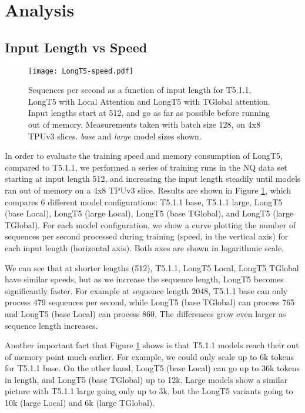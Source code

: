 \documentclass[11pt]{article}
\begin{document}
\section{Analysis}\label{sec:analysis}




\subsection{Input Length vs Speed}\label{subsec:analysis:speed}

\begin{figure}[t!]
	\texttt{[image: LongT5-speed.pdf]}
	\centering
	\caption{Sequences per second as a function of input length for T5.1.1, LongT5 with Local Attention and LongT5 with TGlobal attention. Input lengths start at 512, and go as far as possible before running out of memory. Measurements taken with batch size 128, on 4x8 TPUv3 slices. {\em base} and {\em large} model sizes shown.}
	\label{fig:speed}
\end{figure}

In order to evaluate the training speed and memory consumption of LongT5, compared to T5.1.1, we performed a series of training runs in the NQ data set starting at input length 512, and increasing the input length steadily until models ran out of memory on a 4x8 TPUv3 slice. Results are shown in Figure \ref{fig:speed}, which compares 6 different model configurations: T5.1.1 base, T5.1.1 large, LongT5 (base Local), LongT5 (large Local), LongT5 (base TGlobal), and LongT5 (large TGlobal). For each model configuration, we show a curve plotting the number of sequences per second processed during training (speed, in the vertical axis) for each input length (horizontal axis). Both axes are shown in logarithmic scale.

We can see that at shorter lengths (512), T5.1.1, LongT5 Local, LongT5 TGlobal have similar speeds, but as we increase the sequence length, LongT5 becomes significantly faster. For example at sequence length 2048, T5.1.1 base can only process 479 sequences per second, while LongT5 (base TGlobal) can process 765 and LongT5 (base Local) can process 860. The differences grow even larger as sequence length increases.

Another important fact that Figure \ref{fig:speed} shows is that T5.1.1 models reach their out of memory point much earlier. For example, we could only scale up to 6k tokens for T5.1.1 base. On the other hand, LongT5 (base Local) can go up to 36k tokens in length, and LongT5 (base TGlobal) up to 12k. Large models show a similar picture with T5.1.1 large going only up to 3k, but the LongT5 variants going to 10k (large Local) and 6k (large TGlobal).
\end{document}
